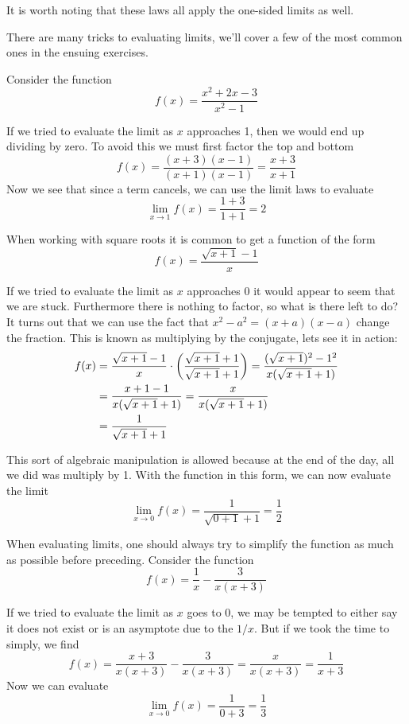 It is worth noting that these laws all apply the one-sided limits as well.

There are many tricks to evaluating limits, we'll cover a few of the most common ones in the ensuing exercises.
\begin{example}
	Consider the function
	\[ f(x) = \frac{x^2 + 2x - 3}{x^2 - 1} \]
	
	If we tried to evaluate the limit as $x$ approaches 1, then we would end up dividing by zero. To avoid this we must first factor the top and bottom
	\[ f(x) = \frac{(x + 3)(x - 1)}{(x + 1)(x - 1)} = \frac{x + 3}{x + 1} \]
	Now we see that since a term cancels, we can use the limit laws to evaluate
	\[ \lim_{x \to 1} f(x) = \frac{1 + 3}{1 + 1} = 2 \]
\end{example}

\begin{example}
	When working with square roots it is common to get a function of the form
	\[ f(x) = \frac{\sqrt{x + 1} - 1}{x} \]
	
	If we tried to evaluate the limit as $x$ approaches 0 it would appear to seem that we are stuck. Furthermore there is nothing to factor, so what is there left to do? It turns out that we can use the fact that $x^2 - a^2 = (x + a)(x - a)$ change the fraction. This is known as multiplying by the conjugate, lets see it in action:
	\begin{align*}
		f(x) &= \frac{\sqrt{x + 1} - 1}{x} \cdot \qty(\frac{\sqrt{x + 1} + 1}{\sqrt{x + 1} + 1}) = \frac{(\sqrt{x + 1})^2 - 1^2}{x(\sqrt{x + 1} + 1)} \\
		&= \frac{x + 1 - 1}{x(\sqrt{x + 1} + 1)} = \frac{x}{x(\sqrt{x + 1} + 1)}\\
		&= \frac{1}{\sqrt{x + 1} + 1}
	\end{align*}
	
	This sort of algebraic manipulation is allowed because at the end of the day, all we did was multiply by 1. With the function in this form, we can now evaluate the limit
	\[ \lim_{x \to 0} f(x) = \frac{1}{\sqrt{0 + 1} + 1} = \frac{1}{2} \]
\end{example}

\begin{example}
	When evaluating limits, one should always try to simplify the function as much as possible before preceding. Consider the function
	\[ f(x) = \frac{1}{x} - \frac{3}{x(x + 3)} \]
	
	If we tried to evaluate the limit as $x$ goes to 0, we may be tempted to either say it does not exist or is an asymptote due to the $1/x$. But if we took the time to simply, we find
	\[ f(x) = \frac{x + 3}{x(x + 3)} - \frac{3}{x(x + 3)} = \frac{x}{x(x + 3)} = \frac{1}{x + 3} \]
	Now we can evaluate
	\[ \lim_{x \to 0} f(x) = \frac{1}{0 + 3} = \frac{1}{3} \]
\end{example}

